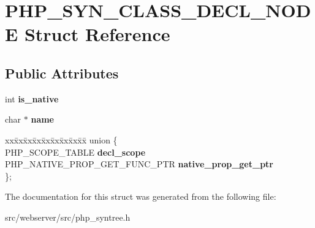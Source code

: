 \section{PHP\_\-SYN\_\-CLASS\_\-DECL\_\-NODE Struct Reference}
\label{structPHP__SYN__CLASS__DECL__NODE}
\subsection*{Public Attributes}
\begin{DoxyCompactItemize}
\item 
int {\bfseries is\_\-native}\label{structPHP__SYN__CLASS__DECL__NODE_aec27da83c53652f2d87ed046091a6af7}

\item 
char $\ast$ {\bfseries name}\label{structPHP__SYN__CLASS__DECL__NODE_a10ad69f849c2cf7a33b996e3b94e994e}

\item 
\begin{tabbing}
xx\=xx\=xx\=xx\=xx\=xx\=xx\=xx\=xx\=\kill
union \{\\
\>PHP\_SCOPE\_TABLE {\bfseries decl\_scope}\\
\>PHP\_NATIVE\_PROP\_GET\_FUNC\_PTR {\bfseries native\_prop\_get\_ptr}\\
\}; \label{structPHP__SYN__CLASS__DECL__NODE_ac4abdf171154d00f3413912930cdf052}
\\

\end{tabbing}\end{DoxyCompactItemize}


The documentation for this struct was generated from the following file:\begin{DoxyCompactItemize}
\item 
src/webserver/src/php\_\-syntree.h\end{DoxyCompactItemize}
